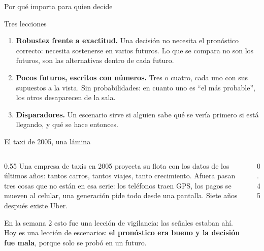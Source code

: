 \documentclass{beamer}
\begin{document}
\begin{frame}{Por qué importa para quien decide}
\small
\begin{block}{Tres lecciones}
\begin{enumerate}\itemsep4pt
  \item \textbf{Robustez frente a exactitud.} Una decisión no necesita el pronóstico correcto: necesita sostenerse en varios futuros. Lo que se compara no son los futuros, son las alternativas dentro de cada futuro.
  \item \textbf{Pocos futuros, escritos con números.} Tres o cuatro, cada uno con sus supuestos a la vista. Sin probabilidades: en cuanto uno es ``el más probable'', los otros desaparecen de la sala.
  \item \textbf{Disparadores.} Un escenario sirve si alguien sabe qué se vería primero si está llegando, y qué se hace entonces.
\end{enumerate}
\end{block}
\end{frame}

\begin{frame}{El taxi de 2005, una lámina}
\begin{columns}[T]
\begin{column}{0.55\textwidth}
\small
Una empresa de taxis en 2005 proyecta su flota con los datos de los últimos años: tantos carros, tantos viajes, tanto crecimiento. Afuera pasan tres cosas que no están en esa serie: los teléfonos traen GPS, los pagos se mueven al celular, una generación pide todo desde una pantalla. Siete años después existe Uber.

\medskip
En la semana 2 esto fue una lección de vigilancia: las señales estaban ahí. Hoy es una lección de escenarios: \textbf{el pronóstico era bueno y la decisión fue mala}, porque solo se probó en un futuro.
\end{column}
\begin{column}{0.45\textwidth}
\end{column}
\end{columns}
\end{frame}
\end{document}
